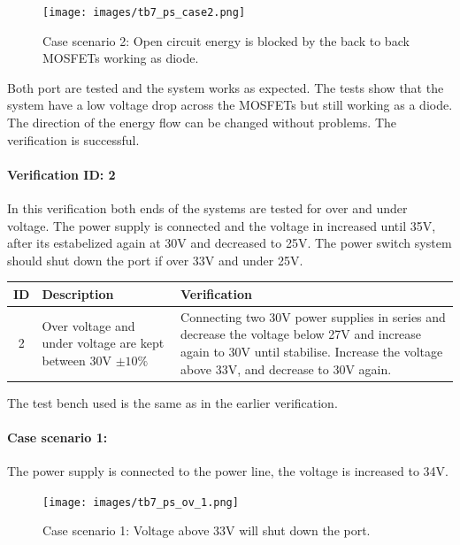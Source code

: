 \begin{figure}[H]
	\begin{centering}
		\texttt{[image: images/tb7\_ps\_case2.png]}
		\caption{Case scenario 2: Open circuit energy is blocked by the back to back MOSFETs working as diode.}
	\end{centering}
\end{figure}

Both port are tested and the system works as expected. The tests show that the system have a low voltage drop across the MOSFETs but still working as a diode. The direction of the energy flow can be changed without problems. The verification is successful.

\paragraph{Verification ID: 2}
In this verification both ends of the systems are tested for over and under voltage. The power supply is connected and the voltage in increased until 35V, after its estabelized again at 30V and decreased to 25V. The power switch system should shut down the port if over 33V and under 25V.

\begin{table}[H]
\centering
	\begin{tabular}{| c | l | p{7cm} | }
		\hline
		ID & Description & Verification \\\hline
		2 & Over voltage and under voltage are kept between 30V $ \pm10\% $ & Connecting two 30V power supplies in series and decrease the voltage below 27V and increase again to 30V until stabilise. Increase the voltage above 33V, and decrease to 30V again. \\\hline
	\end{tabular}
\end{table}

The test bench used is the same as in the earlier verification.

\paragraph{Case scenario 1:} The power supply is connected to the power line, the voltage is increased to 34V.

\begin{figure}[H]
	\begin{centering}
		\texttt{[image: images/tb7\_ps\_ov\_1.png]}
		\caption{Case scenario 1: Voltage above 33V will shut down the port.}
	\end{centering}
\end{figure}

